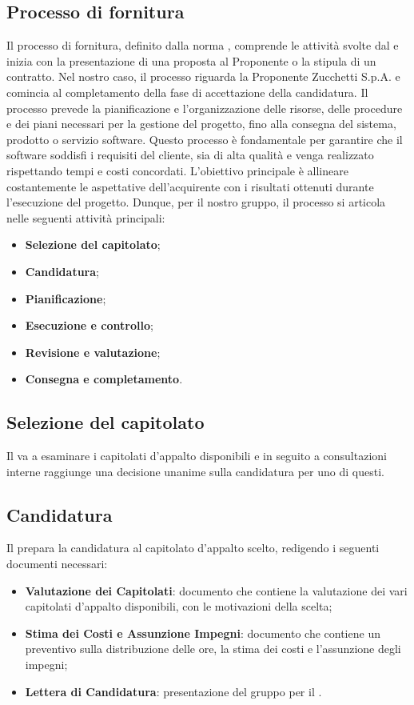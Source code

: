 \subsection{Processo di fornitura}
\label{subsection:processo_fornitura}
Il processo di fornitura, definito dalla norma , comprende le attività svolte dal  e inizia con la presentazione di una proposta al Proponente o la stipula di un contratto. Nel nostro caso, il processo riguarda la Proponente Zucchetti S.p.A. e comincia al completamento della fase di accettazione della candidatura.
Il processo prevede la pianificazione e l’organizzazione delle risorse, delle procedure e dei piani necessari per la gestione del progetto, fino alla consegna del sistema, prodotto o servizio software. Questo processo è fondamentale per garantire che il software soddisfi i requisiti del cliente, sia di alta qualità e venga realizzato rispettando tempi e costi concordati. L’obiettivo principale è allineare costantemente le aspettative dell’acquirente con i risultati ottenuti durante l’esecuzione del progetto.
Dunque, per il nostro gruppo, il processo si articola nelle seguenti attività principali:
\begin{itemize}
    \item \textbf{Selezione del capitolato};
    \item \textbf{Candidatura};
    \item \textbf{Pianificazione};
    \item \textbf{Esecuzione e controllo};
    \item \textbf{Revisione e valutazione};
    \item \textbf{Consegna e completamento}.
\end{itemize}
\subsection{Selezione del capitolato}
Il  va a esaminare i capitolati d'appalto disponibili e in seguito a consultazioni interne raggiunge una decisione unanime sulla candidatura per uno di questi.

\subsection{Candidatura}
Il  prepara la candidatura al capitolato d'appalto scelto, redigendo i seguenti documenti necessari:
\begin{itemize}
    \item \textbf{Valutazione dei Capitolati}: documento che contiene la valutazione dei vari capitolati d'appalto disponibili, con le motivazioni della scelta;
    \item \textbf{Stima dei Costi e Assunzione Impegni}: documento che contiene un preventivo sulla distribuzione delle ore, la stima dei costi e l'assunzione degli impegni;
    \item \textbf{Lettera di Candidatura}: presentazione del gruppo per il .
\end{itemize}    

